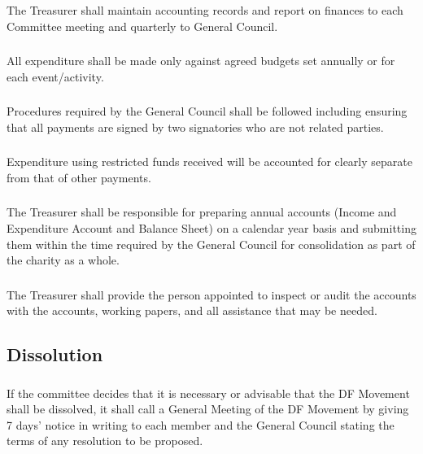 \documentclass[a4paper, 11pt]{report}
\begin{document}
\subsubsection{}
The Treasurer shall maintain accounting records and report on finances to each Committee meeting and quarterly to General Council.
\subsubsection{}
All expenditure shall be made only against agreed budgets set annually or for each event/activity.
\subsubsection{}
Procedures required by the General Council shall be followed including ensuring that all payments are signed by two signatories who are not related parties.
\subsubsection{}
Expenditure using restricted funds received will be accounted for clearly separate from that of other payments.
\subsubsection{}
The Treasurer shall be responsible for preparing annual accounts (Income and Expenditure Account and Balance Sheet) on a calendar year basis and submitting them within the time required by the General Council for consolidation as part of the charity as a whole.
\subsubsection{}
The Treasurer shall provide the person appointed to inspect or audit the accounts with the accounts, working papers, and all assistance that may be needed.

\subsection{Dissolution}
\subsubsection{}
If the committee decides that it is necessary or advisable that the DF Movement shall be dissolved, it shall call a General Meeting of the DF Movement by giving 7 days' notice in writing to each member and the General Council stating the terms of any resolution to be proposed.
\end{document}
